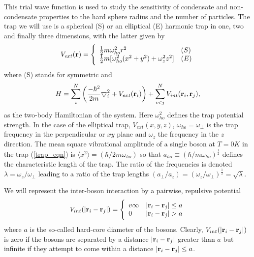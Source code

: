 \documentclass[10pt]{article}
\begin{document}
 This trial wave function is used to study the sensitivity of
 condensate and non-condensate properties to the hard sphere radius
 and the number of particles.  The trap we will use is a spherical (S)
 or an elliptical (E) harmonic trap in one, two and finally three
 dimensions, with the latter given by
  \begin{equation}
 V_{ext}({\bf r}) = 
 \Bigg\{
 \begin{array}{ll}
	 \frac{1}{2}m\omega_{ho}^2r^2 & (S)\\
 \strut
	 \frac{1}{2}m[\omega_{ho}^2(x^2+y^2) + \omega_z^2z^2] & (E)
 \label{trap_eqn}
 \end{array}
 \end{equation}
 where (S) stands for symmetric and 
 \begin{equation}
     H = \sum_i^N \left(
	 \frac{-\hbar^2}{2m}
	 { \bigtriangledown }_{i}^2 +
	 V_{ext}({\bf{r}}_i)\right)  +
	 \sum_{i<j}^{N} V_{int}({\bf{r}}_i,{\bf{r}}_j),
 \end{equation}
 as the two-body Hamiltonian of the system.  Here $\omega_{ho}^2$
 defines the trap potential strength.  In the case of the elliptical
 trap, $V_{ext}(x,y,z)$, $\omega_{ho}=\omega_{\perp}$ is the trap
 frequency in the perpendicular or $xy$ plane and $\omega_z$ the
 frequency in the $z$ direction.  The mean square vibrational
 amplitude of a single boson at $T=0K$ in the trap (\ref{trap_eqn}) is
 $\langle x^2\rangle=(\hbar/2m\omega_{ho})$ so that $a_{ho} \equiv
 (\hbar/m\omega_{ho})^{\frac{1}{2}}$ defines the characteristic length
 of the trap.  The ratio of the frequencies is denoted
 $\lambda=\omega_z/\omega_{\perp}$ leading to a ratio of the trap
 lengths $(a_{\perp}/a_z)=(\omega_z/\omega_{\perp})^{\frac{1}{2}} =
 \sqrt{\lambda}$.

 We will represent the inter-boson interaction by a pairwise,
 repulsive potential
 \begin{equation}
 V_{int}(|{\bf r}_i-{\bf r}_j|) =  \Bigg\{
 \begin{array}{ll}
v	 \infty & {|{\bf r}_i-{\bf r}_j|} \leq {a}\\
	 0 & {|{\bf r}_i-{\bf r}_j|} > {a}
 \end{array}
 \end{equation}
 where ${a}$ is the so-called hard-core diameter of the bosons.
 Clearly, $V_{int}(|{\bf r}_i-{\bf r}_j|)$ is zero if the bosons are
 separated by a distance $|{\bf r}_i-{\bf r}_j|$ greater than $a$ but
 infinite if they attempt to come within a distance $|{\bf r}_i-{\bf r}_j| \leq a$.
\end{document}
